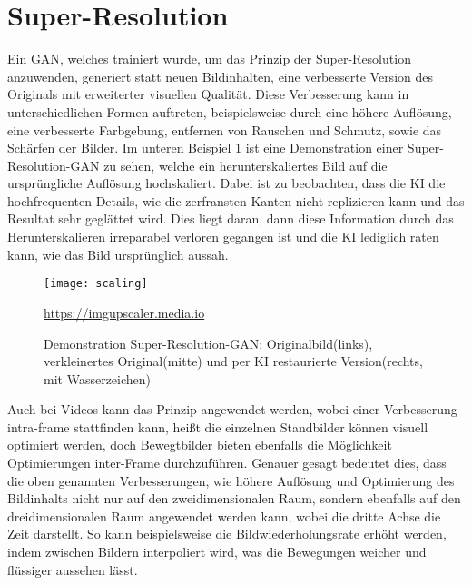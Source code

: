 \section{Super-Resolution}

\noindent Ein \ac{GAN}, welches trainiert wurde, um das Prinzip der Super-Resolution anzuwenden, generiert statt neuen Bildinhalten, eine verbesserte Version des Originals mit erweiterter visuellen Qualität. Diese Verbesserung kann in unterschiedlichen Formen auftreten, beispielsweise durch eine höhere Auflösung, eine verbesserte Farbgebung, entfernen von Rauschen und Schmutz, sowie das Schärfen der Bilder. Im unteren Beispiel \ref{fig:scaling} ist eine Demonstration einer Super-Resolution-GAN zu sehen, welche ein herunterskaliertes Bild auf die ursprüngliche Auflösung hochskaliert. Dabei ist zu beobachten, dass die KI die hochfrequenten Details, wie die zerfransten Kanten nicht replizieren kann und das Resultat sehr geglättet wird. Dies liegt daran, dann diese Information durch das Herunterskalieren irreparabel verloren gegangen ist und die KI lediglich raten kann, wie das Bild ursprünglich aussah.\\


\begin{figure}[H]
    \centering
    \texttt{[image: scaling]}
    \caption{Demonstration Super-Resolution-GAN: Originalbild(links), verkleinertes Original(mitte) und per KI restaurierte Version(rechts, mit Wasserzeichen)} \quelle\url{https://imgupscaler.media.io}
\label{fig:scaling}
\end{figure}


\noindent Auch bei Videos kann das Prinzip angewendet werden, wobei einer Verbesserung intra-frame stattfinden kann, heißt die einzelnen Standbilder können visuell optimiert werden, doch Bewegtbilder bieten ebenfalls die Möglichkeit Optimierungen inter-Frame durchzuführen. Genauer gesagt bedeutet dies, dass die oben genannten Verbesserungen, wie höhere Auflösung und Optimierung des Bildinhalts nicht nur auf den zweidimensionalen Raum, sondern ebenfalls auf den dreidimensionalen Raum angewendet werden kann, wobei die dritte Achse die Zeit darstellt. So kann beispielsweise die Bildwiederholungsrate erhöht werden, indem zwischen Bildern interpoliert wird, was die Bewegungen weicher und flüssiger aussehen lässt.
\newpage
